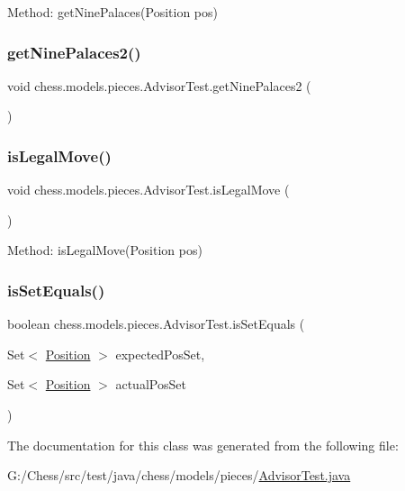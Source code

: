 Method\+: get\+Nine\+Palaces(\+Position pos) \mbox{\label{classchess_1_1models_1_1pieces_1_1_advisor_test_aaa1de333725dbd1fb065c71272d9d555}} 
\subsubsection{\texorpdfstring{get\+Nine\+Palaces2()}{getNinePalaces2()}}
{\footnotesize\ttfamily void chess.\+models.\+pieces.\+Advisor\+Test.\+get\+Nine\+Palaces2 (\begin{DoxyParamCaption}{ }\end{DoxyParamCaption})}

\mbox{\label{classchess_1_1models_1_1pieces_1_1_advisor_test_a865ff283ac107e64d2d27044ff25d02e}} 
\subsubsection{\texorpdfstring{is\+Legal\+Move()}{isLegalMove()}}
{\footnotesize\ttfamily void chess.\+models.\+pieces.\+Advisor\+Test.\+is\+Legal\+Move (\begin{DoxyParamCaption}{ }\end{DoxyParamCaption})}

Method\+: is\+Legal\+Move(\+Position pos) \mbox{\label{classchess_1_1models_1_1pieces_1_1_advisor_test_a620e5937f1e6bbe806b60f364e103d19}} 
\subsubsection{\texorpdfstring{is\+Set\+Equals()}{isSetEquals()}}
{\footnotesize\ttfamily boolean chess.\+models.\+pieces.\+Advisor\+Test.\+is\+Set\+Equals (\begin{DoxyParamCaption}\item[{Set$<$ \mbox{\hyperlink{classchess_1_1models_1_1_position}{Position}} $>$}]{expected\+Pos\+Set,  }\item[{Set$<$ \mbox{\hyperlink{classchess_1_1models_1_1_position}{Position}} $>$}]{actual\+Pos\+Set }\end{DoxyParamCaption})}



The documentation for this class was generated from the following file\+:\begin{DoxyCompactItemize}
\item 
G\+:/\+Chess/src/test/java/chess/models/pieces/\mbox{\hyperlink{_advisor_test_8java}{Advisor\+Test.\+java}}\end{DoxyCompactItemize}
